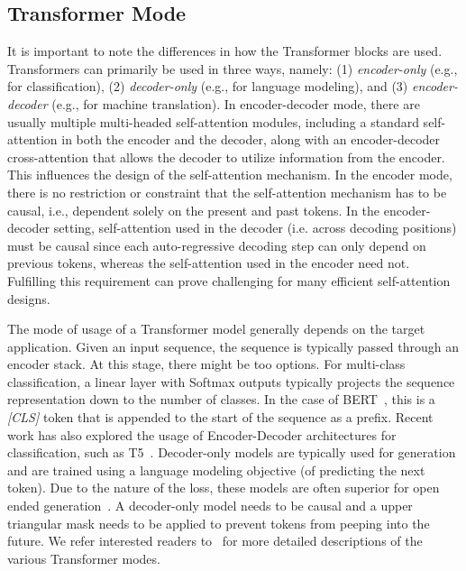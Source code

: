 \subsection{Transformer Mode} It is important to note the differences in how the Transformer blocks are used. Transformers can primarily be used in three ways, namely: (1) \emph{encoder-only} (e.g., for classification), (2) \emph{decoder-only} (e.g., for language modeling), and (3) \emph{encoder-decoder} (e.g., for machine translation). In encoder-decoder mode, there are usually multiple multi-headed self-attention modules, including a standard self-attention in both the encoder and the decoder, along with an encoder-decoder cross-attention that allows the decoder to utilize information from the encoder. This influences the design of the self-attention mechanism. In the encoder mode, there is no restriction or constraint that the self-attention mechanism has to be causal, i.e., dependent solely on the present and past tokens. In the encoder-decoder setting, self-attention used in the decoder (i.e. across decoding positions) must be causal since each auto-regressive decoding step can only depend on previous tokens, whereas the self-attention used in the encoder need not. Fulfilling this requirement can prove challenging for many efficient self-attention designs.

The mode of usage of a Transformer model generally depends on the target application. Given an input sequence, the sequence is typically passed through an encoder stack. At this stage, there might be too options. For multi-class classification, a linear layer with Softmax outputs typically projects the sequence representation down to the number of classes. In the case of BERT~\citep{devlin2018bert}, this is a \textit{[CLS]} token that is appended to the start of the sequence as a prefix. Recent work has also explored the usage of Encoder-Decoder architectures for classification, such as T5~\citep{raffel2019exploring}. Decoder-only models are typically used for generation and are trained using a language modeling objective (of predicting the next token). Due to the nature of the loss, these models are often superior for open ended generation~\citep{brown2020language}. A decoder-only model needs to be causal and a upper triangular mask needs to be applied to prevent tokens from peeping into the future. We refer interested readers to~\citep{raffel2019exploring} for more detailed descriptions of the various Transformer modes.

